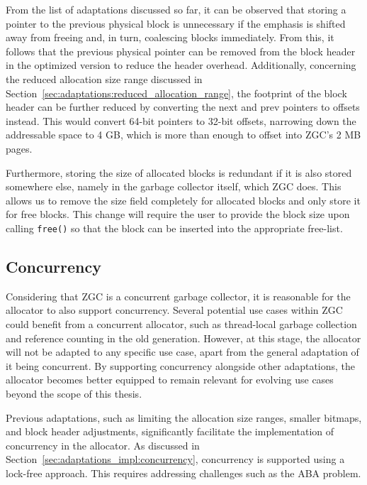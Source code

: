 From the list of adaptations discussed so far, it can be observed that storing a pointer to the previous physical block is unnecessary if the emphasis is shifted away from freeing and, in turn, coalescing blocks immediately. From this, it follows that the previous physical pointer can be removed from the block header in the optimized version to reduce the header overhead. Additionally, concerning the reduced allocation size range discussed in Section~\ref{sec:adaptations:reduced_allocation_range}, the footprint of the block header can be further reduced by converting the next and prev pointers to offsets instead. This would convert 64-bit pointers to 32-bit offsets, narrowing down the addressable space to 4 GB, which is more than enough to offset into ZGC's 2 MB pages.

Furthermore, storing the size of allocated blocks is redundant if it is also stored somewhere else, namely in the garbage collector itself, which ZGC does. This allows us to remove the size field completely for allocated blocks and only store it for free blocks. This change will require the user to provide the block size upon calling \texttt{free()} so that the block can be inserted into the appropriate free-list.

\subsection{Concurrency}

Considering that ZGC is a concurrent garbage collector, it is reasonable for the allocator to also support concurrency. Several potential use cases within ZGC could benefit from a concurrent allocator, such as thread-local garbage collection and reference counting in the old generation. However, at this stage, the allocator will not be adapted to any specific use case, apart from the general adaptation of it being concurrent. By supporting concurrency alongside other adaptations, the allocator becomes better equipped to remain relevant for evolving use cases beyond the scope of this thesis.

Previous adaptations, such as limiting the allocation size ranges, smaller bitmaps, and block header adjustments, significantly facilitate the implementation of concurrency in the allocator. As discussed in Section~\ref{sec:adaptations_impl:concurrency}, concurrency is supported using a lock-free approach. This requires addressing challenges such as the ABA problem.

